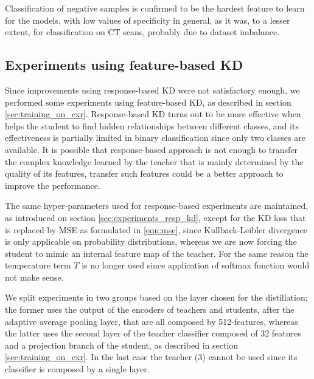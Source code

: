 Classification of negative samples is confirmed to be the hardest feature to learn for the models, with low values of specificity in general, as it was, to a lesser extent, for classification on CT scans, probably due to dataset imbalance.


\subsection{Experiments using feature-based KD}\label{sec:experiments_feat_kd}

Since improvements using response-based KD were not satisfactory enough, we performed some experiments using feature-based KD, as described in section \ref{sec:training_on_cxr}.
Response-based KD turns out to be more effective when helps the student to find hidden relationships between different classes, and its effectiveness is partially limited in binary classification since only two classes are available.
It is possible that response-based approach is not enough to transfer the complex knowledge learned by the teacher that is mainly determined by the quality of its features, transfer such features could be a better approach to improve the performance.

The same hyper-parameters used for response-based experiments are maintained, as introduced on section \ref{sec:experiments_resp_kd}, except for the KD loss that is replaced by MSE as formulated in \ref{eqn:mse}, since Kullback-Leibler divergence is only applicable on probability distributions, whereas we are now forcing the student to mimic an internal feature map of the teacher.
For the same reason the temperature term $T$ is no longer used since application of softmax function would not make sense.

We split experiments in two groups based on the layer chosen for the distillation; the former uses the output of the encoders of teachers and students, after the adaptive average pooling layer, that are all composed by 512-features, whereas the latter uses the second layer of the teacher classifier composed of 32 features and a projection branch of the student, as described in section \ref{sec:training_on_cxr}. In the last case the teacher (3) cannot be used since its classifier is composed by a single layer.

